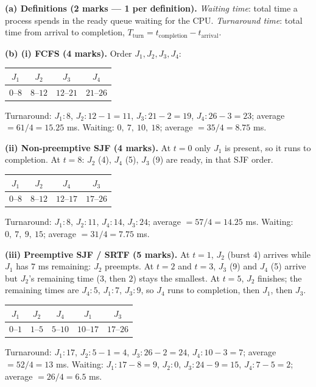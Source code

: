 \documentclass[11pt]{article}
\begin{document}
\begin{corrige}
\textbf{(a) Definitions (2 marks — 1 per definition).} \emph{Waiting time}: total time a process spends in the ready queue waiting for the CPU. \emph{Turnaround time}: total time from arrival to completion, $T_{\text{turn}} = t_{\text{completion}} - t_{\text{arrival}}$.

\textbf{(b) (i) FCFS (4 marks).} Order $J_1, J_2, J_3, J_4$:
\begin{center}
\begin{tabular}{|c|c|c|c|}
\hline
\rowcolor{popblueL} $J_1$ & $J_2$ & $J_3$ & $J_4$ \\
\hline
$0$--$8$ & $8$--$12$ & $12$--$21$ & $21$--$26$ \\
\hline
\end{tabular}
\end{center}
Turnaround: $J_1\!:8$, $J_2\!:12-1=11$, $J_3\!:21-2=19$, $J_4\!:26-3=23$; average $= 61/4 = 15.25$ ms.
Waiting: $0,\ 7,\ 10,\ 18$; average $= 35/4 = 8.75$ ms.

\textbf{(ii) Non-preemptive SJF (4 marks).} At $t=0$ only $J_1$ is present, so it runs to completion. At $t=8$: $J_2$ (4), $J_4$ (5), $J_3$ (9) are ready, in that SJF order.
\begin{center}
\begin{tabular}{|c|c|c|c|}
\hline
\rowcolor{popblueL} $J_1$ & $J_2$ & $J_4$ & $J_3$ \\
\hline
$0$--$8$ & $8$--$12$ & $12$--$17$ & $17$--$26$ \\
\hline
\end{tabular}
\end{center}
Turnaround: $J_1\!:8$, $J_2\!:11$, $J_4\!:14$, $J_3\!:24$; average $= 57/4 = 14.25$ ms.
Waiting: $0,\ 7,\ 9,\ 15$; average $= 31/4 = 7.75$ ms.

\textbf{(iii) Preemptive SJF / SRTF (5 marks).} At $t=1$, $J_2$ (burst $4$) arrives while $J_1$ has $7$ ms remaining: $J_2$ preempts. At $t=2$ and $t=3$, $J_3$ (9) and $J_4$ (5) arrive but $J_2$'s remaining time ($3$, then $2$) stays the smallest. At $t=5$, $J_2$ finishes; the remaining times are $J_4\!:5$, $J_1\!:7$, $J_3\!:9$, so $J_4$ runs to completion, then $J_1$, then $J_3$.
\begin{center}
\begin{tabular}{|c|c|c|c|c|}
\hline
\rowcolor{popblueL} $J_1$ & $J_2$ & $J_4$ & $J_1$ & $J_3$ \\
\hline
$0$--$1$ & $1$--$5$ & $5$--$10$ & $10$--$17$ & $17$--$26$ \\
\hline
\end{tabular}
\end{center}
Turnaround: $J_1\!:17$, $J_2\!:5-1=4$, $J_3\!:26-2=24$, $J_4\!:10-3=7$; average $= 52/4 = 13$ ms.
Waiting: $J_1\!:17-8=9$, $J_2\!:0$, $J_3\!:24-9=15$, $J_4\!:7-5=2$; average $= 26/4 = 6.5$ ms.


\end{corrige}
\end{document}
